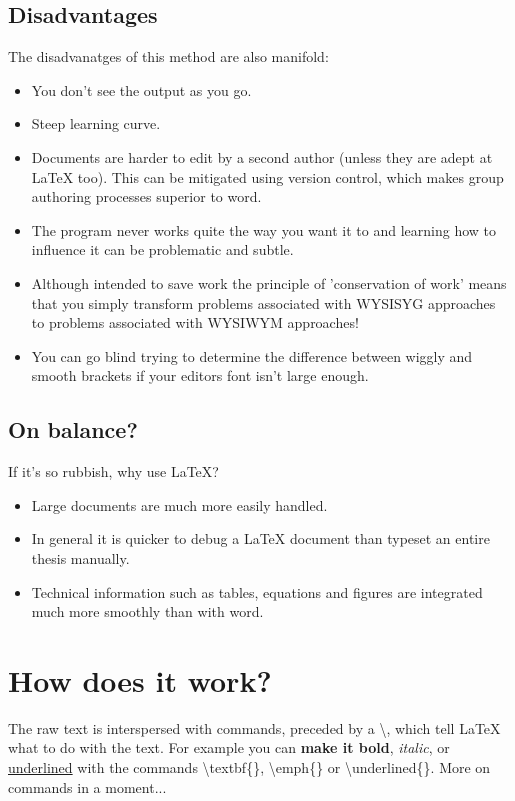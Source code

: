 \subsection{Disadvantages}
The disadvanatges of this method are also manifold:
\begin{itemize}
\item You don't see the output as you go.
\item Steep learning curve.
\item Documents are harder to edit by a second author (unless they are adept at LaTeX too). This can be mitigated using version control, which makes group authoring processes superior to word.
\item The program never works quite the way you want it to and learning how to influence it can be problematic and subtle.
\item Although intended to save work the principle of 'conservation of work' means that you simply transform problems associated with WYSISYG approaches to problems associated with WYSIWYM approaches!
\item You can go blind trying to determine the difference between wiggly and smooth brackets if your editors font isn't large enough.
\end{itemize}

\subsection{On balance?}
If it's so rubbish, why use LaTeX?

\begin{itemize}
\item Large documents are much more easily handled. 
\item In general it is quicker to debug a LaTeX document than typeset an entire thesis manually. 
\item Technical information such as tables, equations and figures are integrated much more smoothly than with word.
\end{itemize}

\section{How does it work?}

The raw text is interspersed with commands, preceded by a \textbackslash, which tell LaTeX what to do with the text. For example you can \textbf{make it bold}, \emph{italic}, or \underline{underlined} with the commands {\textbackslash}textbf\{\}, {\textbackslash}emph\{\} or {\textbackslash}underlined\{\}. More on commands in a moment...


